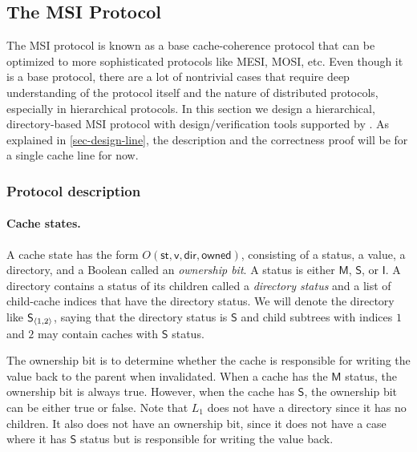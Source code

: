 \documentclass[sigplan,10pt,review,anonymous,screen]{acmart}\settopmatter{printfolios=true,printccs=false,printacmref=false}
\begin{document}
\subsection{The MSI Protocol}
\label{sec-msi-protocol}

\newcommand{\mesi}{\ensuremath{\textsf{MESI}}}
\newcommand{\msi}{\ensuremath{\textsf{MSI}}}
\newcommand{\stM}{\ensuremath{\textsf{M}}}
\newcommand{\stE}{\ensuremath{\textsf{E}}}
\newcommand{\stS}{\ensuremath{\textsf{S}}}
\newcommand{\stI}{\ensuremath{\textsf{I}}}
\newcommand{\dir}[2]{\ensuremath{#1_{\tuple{#2}}}}

The MSI protocol is known as a base cache-coherence protocol that can be optimized to more sophisticated protocols like MESI, MOSI, etc.
Even though it is a base protocol, there are a lot of nontrivial cases that require deep understanding of the protocol itself and the nature of distributed protocols, especially in hierarchical protocols.
In this section we design a hierarchical, directory-based MSI protocol with design/verification tools supported by \hemiola{}.
As explained in \autoref{sec-design-line}, the description and the correctness proof will be for a single cache line for now.

\subsubsection{Protocol description}

\paragraph{Cache states.}
A cache state has the form $O(\textsf{st}, \textsf{v}, \textsf{dir}, \textsf{owned})$, consisting of a status, a value, a directory, and a Boolean called an \emph{ownership bit}.
A status is either \stM{}, \stS{}, or \stI{}.
A directory contains a status of its children called a \emph{directory status} and a list of child-cache indices that have the directory status.
We will denote the directory like $\dir{\stS{}}{1, 2}$, saying that the directory status is \stS{} and child subtrees with indices $1$ and $2$ may contain caches with \stS{} status.

The ownership bit is to determine whether the cache is responsible for writing the value back to the parent when invalidated.
When a cache has the \stM{} status, the ownership bit is always true.
However, when the cache has \stS{}, the ownership bit can be either true or false.
Note that $L_1$ does not have a directory since it has no children.
It also does not have an ownership bit, since it does not have a case where it has \stS{} status but is responsible for writing the value back.
\end{document}

